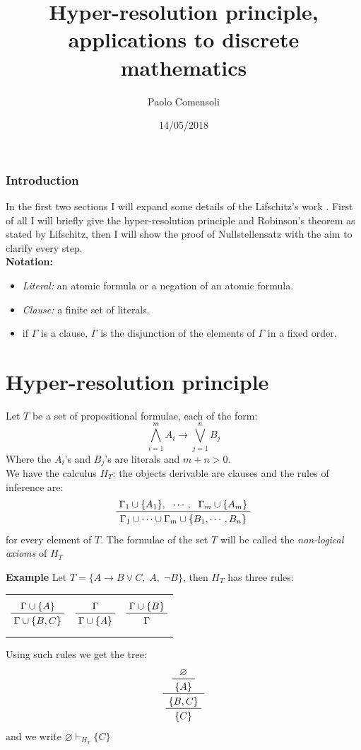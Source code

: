 \documentclass[a4paper,12pt,twoside]{book}
\title{Hyper-resolution principle, applications to discrete mathematics}
\author{Paolo Comensoli}
\date{14/05/2018}
\let\emptyset\varnothing
\let\o\vee
\begin{document}
\maketitle
\thispagestyle{empty}
\tableofcontents
\newpage
\subsection*{Introduction}

\thispagestyle{empty}
\noindent In the first two sections I will expand some details of the Lifschitz's work \cite{lifschitz}.
First of all I will briefly give the hyper-resolution principle and Robinson's theorem as stated by Lifschitz, then I will show the proof of Nullstellensatz with the aim to clarify every step.\\
\textbf{Notation:}
\begin{itemize}
\item \textit{Literal:} an atomic formula or a negation of an atomic formula.
\item \textit{Clause:} a finite set of literals.
\item if $\Gamma$ is a clause, $\overline{\Gamma}$ is the disjunction of the elements of $\Gamma$ in a fixed order.
\end{itemize}


\chapter{Hyper-resolution principle}

Let $T$ be a set of propositional formulae, each of the form:
$$\bigwedge_{i=1}^m A_i \rightarrow \bigvee_{j=1}^n B_j 
$$Where the $A_i$'s and $B_j$'s are literals and $m+n>0$.\\
We have the calculus $H_T$: the objects derivable are clauses and the rules of inference are:
\begin{equation}\label{axiom}
\prftree{\Gamma_1 \cup \{A_1\} ,} {\cdots,} {\Gamma_m \cup \{A_m\} } 
{\Gamma_1\cup\cdots\cup\Gamma_m\cup\{ B_1 ,\cdots ,B_n\}}
\end{equation}
for every element of $T$. The formulae of the set $T$ will be called the \textit{non-logical axioms} of $H_T$


\noindent\textbf{Example} Let $T=\{ A \rightarrow B \o C ,\; A,\; \neg B \}$, then $H_T$ has three rules:

\begin{center}
\begin{tabular}{ccc}
$$\prftree{\Gamma \cup \{A\} }  {\Gamma\cup \{B,C\}} 
$$
& \hspace{5mm}
$$\prftree{\Gamma }  {\Gamma\cup \{A\}} 
$$
& \hspace{5mm}
$$\prftree{\Gamma \cup \{B\} }  {\Gamma }
$$
\end{tabular}
\end{center}
Using such rules we get the tree:
$$
\prftree{\prftree{\emptyset}{\{A\}}}
{\prftree{\{B , C\}}{\{C\}}}
$$
and we write $\emptyset \vdash_{H_T} \{C\}$
\end{document}

